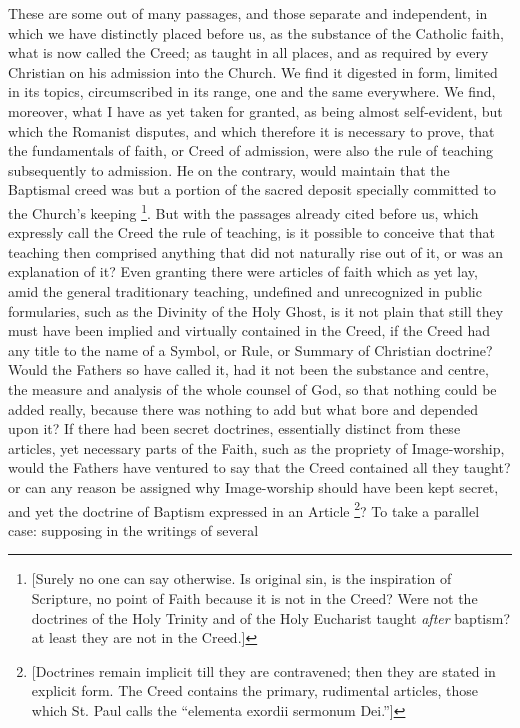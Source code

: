 These are some out of many passages, and those separate and
independent, in which we have distinctly placed before us, as
the substance of the Catholic faith, what is now called the Creed; as
taught in all places, and as required by every Christian on his
admission into the Church. We find it digested in form, limited in its
topics, circumscribed in its range, one and the same everywhere. We
find, moreover, what I have as yet taken for granted, as being almost
self-evident, but which the Romanist disputes, and which therefore it
is necessary to prove, that the fundamentals of faith, or Creed of
admission, were also the rule of teaching subsequently to admission.
He on the contrary, would maintain that the Baptismal creed was but a
portion of the sacred deposit specially committed to the Church's
keeping \footnote{[Surely no one can say otherwise. Is
original sin, is the inspiration of Scripture, no point of Faith
because it is not in the Creed? Were not the doctrines of the Holy
Trinity and of the Holy Eucharist taught \emph{after} baptism? at
least they are not in the Creed.]}. But with the
passages already cited before us, which expressly call the Creed the
rule of teaching, is it possible to conceive that that teaching then
comprised anything that did not naturally rise out of it, or was an
explanation of it? Even granting there were articles of faith which as
yet lay, amid the general traditionary teaching, undefined and
unrecognized in public formularies, such as the Divinity of the Holy
Ghost, is it not plain that still they must have been implied and
virtually contained in the Creed, if the Creed had any title to the
name of a Symbol, or Rule, or Summary of Christian doctrine? Would the
Fathers so have called it, had it not been the substance and centre,
the measure and analysis of the whole counsel of God, so that nothing
could be added really, because there was nothing to add but what bore
and depended upon it? If there had been secret doctrines, essentially
distinct from these articles, yet necessary parts of the Faith, such
as the propriety of Image-worship, would the Fathers have ventured to
say that the Creed contained all they taught? or can any reason
be assigned why Image-worship should have been kept secret, and yet
the doctrine of Baptism expressed in an Article \footnote{[Doctrines remain implicit till they are
contravened; then they are stated in explicit form. The Creed contains
the primary, rudimental articles, those which St. Paul calls the
``elementa exordii sermonum Dei.'']}? To take a parallel case: supposing in the writings of several
